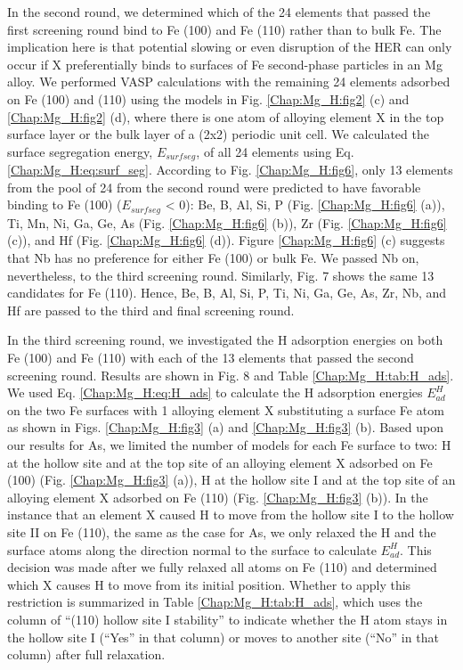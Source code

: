 In the second round, we determined which of the 24 elements that passed the first screening round bind to Fe (100) and Fe (110) rather than to bulk Fe. The implication here is that potential slowing or even disruption of the HER can only occur if X preferentially binds to surfaces of Fe second-phase particles in an Mg alloy. We performed \ac{VASP} calculations with the remaining 24 elements adsorbed on Fe (100) and (110) using the models in Fig. \ref{Chap:Mg_H:fig2} (c) and \ref{Chap:Mg_H:fig2} (d), where there is one atom of alloying element X in the top surface layer or the bulk layer of a (2x2) periodic unit cell. We calculated the surface segregation energy, $E_{surf seg}$, of all 24 elements using Eq. \ref{Chap:Mg_H:eq:surf_seg}. According to Fig. \ref{Chap:Mg_H:fig6}, only 13 elements from the pool of 24 from the second round were predicted to have favorable binding to Fe (100) ($E_{surf seg}$ < 0): Be, B, Al, Si, P (Fig. \ref{Chap:Mg_H:fig6} (a)), Ti, Mn, Ni, Ga, Ge, As (Fig. \ref{Chap:Mg_H:fig6} (b)), Zr (Fig. \ref{Chap:Mg_H:fig6} (c)), and Hf (Fig. \ref{Chap:Mg_H:fig6} (d)). Figure \ref{Chap:Mg_H:fig6} (c) suggests that Nb has no preference for either Fe (100) or bulk Fe. We passed Nb on, nevertheless, to the third screening round. Similarly, Fig. 7 shows the same 13 candidates for Fe (110).  Hence, Be, B, Al, Si, P, Ti, Ni, Ga, Ge, As, Zr, Nb, and Hf are passed to the third and final screening round.





In the third screening round, we investigated the H adsorption energies on both Fe (100) and Fe (110) with each of the 13 elements that passed the second screening round. Results are shown in Fig. 8 and Table \ref{Chap:Mg_H:tab:H_ads}. We used Eq. \ref{Chap:Mg_H:eq:H_ads} to calculate the H adsorption energies $E_{ad}^H$ on the two Fe surfaces with 1 alloying element X substituting a surface Fe atom as shown in Figs. \ref{Chap:Mg_H:fig3} (a) and \ref{Chap:Mg_H:fig3} (b). Based upon our results for As, we limited the number of models for each Fe surface to two: H at the hollow site and at the top site of an alloying element X adsorbed on Fe (100) (Fig. \ref{Chap:Mg_H:fig3} (a)), H at the hollow site I and at the top site of an alloying element X adsorbed on Fe (110) (Fig. \ref{Chap:Mg_H:fig3} (b)). In the instance that an element X caused H to move from the hollow site I to the hollow site II on Fe (110), the same as the case for As, we only relaxed the H and the surface atoms along the direction normal to the surface to calculate $E_{ad}^H$. This decision was made after we fully relaxed all atoms on Fe (110) and determined which X causes H to move from its initial position. Whether to apply this restriction is summarized in Table \ref{Chap:Mg_H:tab:H_ads}, which uses the column of ``(110) hollow site I stability'' to indicate whether the H atom stays in the hollow site I (``Yes'' in that column) or moves to another site (``No'' in that column) after full relaxation.



